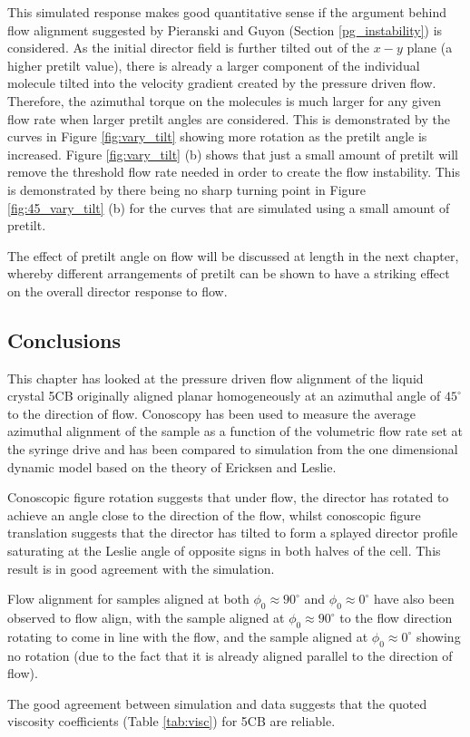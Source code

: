 This simulated response makes good quantitative sense if the argument behind flow alignment suggested by Pieranski and Guyon \cite{Pieranski1974} (Section \ref{pg_instability}) is considered. As the initial director field is further tilted out of the $x-y$ plane (a higher pretilt value), there is already a larger component of the individual molecule tilted into the velocity gradient created by the pressure driven flow. Therefore, the azimuthal torque on the molecules is much larger for any given flow rate when larger pretilt angles are considered. This is demonstrated by the curves in Figure \ref{fig:vary_tilt} showing more rotation as the pretilt angle is increased. Figure \ref{fig:vary_tilt} (b) shows that just a small amount of pretilt will remove the threshold flow rate needed in order to create the flow instability. This is demonstrated by there being no sharp turning point in Figure \ref{fig:45_vary_tilt} (b) for the curves that are simulated using a small amount of pretilt.

The effect of pretilt angle on flow will be discussed at length in the next chapter, whereby different arrangements of pretilt can be shown to have a striking effect on the overall director response to flow.

\subsection{Conclusions}
This chapter has looked at the pressure driven flow alignment of the liquid crystal 5CB originally aligned planar homogeneously at an azimuthal angle of $45^{\circ}$ to the direction of flow. Conoscopy has been used to measure the average azimuthal alignment of the sample as a function of the volumetric flow rate set at the syringe drive and has been compared to simulation from the one dimensional dynamic model based on the theory of Ericksen and Leslie. 

Conoscopic figure rotation suggests that under flow, the director has rotated to achieve an angle close to the direction of the flow, whilst conoscopic figure translation suggests that the director has tilted to form a splayed director profile saturating at the Leslie angle of opposite signs in both halves of the cell. This result is in good agreement with the simulation.

Flow alignment for samples aligned at both $\phi_0\approx90^{\circ}$ and $\phi_0\approx0^{\circ}$ have also been observed to flow align, with the sample aligned at $\phi_0\approx90^{\circ}$ to the flow direction rotating to come in line with the flow, and the sample aligned at $\phi_0\approx0^{\circ}$ showing no rotation (due to the fact that it is already aligned parallel to the direction of flow).

The good agreement between simulation and data suggests that the quoted viscosity coefficients (Table \ref{tab:visc}) for 5CB are reliable.
